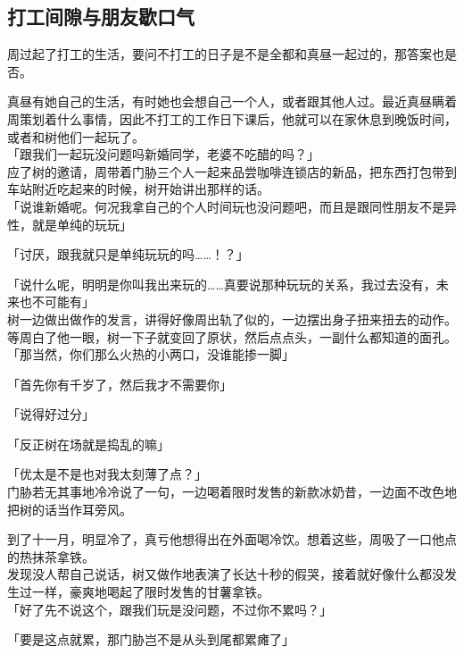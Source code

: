 \subsection{打工间隙与朋友歇口气}

周过起了打工的生活，要问不打工的日子是不是全都和真昼一起过的，那答案也是否。

真昼有她自己的生活，有时她也会想自己一个人，或者跟其他人过。最近真昼瞒着周策划着什么事情，因此不打工的工作日下课后，他就可以在家休息到晚饭时间，或者和树他们一起玩了。\\

「跟我们一起玩没问题吗新婚同学，老婆不吃醋的吗？」\\

应了树的邀请，周带着门胁三个人一起来品尝咖啡连锁店的新品，把东西打包带到车站附近吃起来的时候，树开始讲出那样的话。\\

「说谁新婚呢。何况我拿自己的个人时间玩也没问题吧，而且是跟同性朋友不是异性，就是单纯的玩玩」

「讨厌，跟我就只是单纯玩玩的吗……！？」

「说什么呢，明明是你叫我出来玩的……真要说那种玩玩的关系，我过去没有，未来也不可能有」\\

树一边做出做作的发言，讲得好像周出轨了似的，一边摆出身子扭来扭去的动作。等周白了他一眼，树一下子就变回了原状，然后点点头，一副什么都知道的面孔。\\

「那当然，你们那么火热的小两口，没谁能掺一脚」

「首先你有千岁了，然后我才不需要你」

「说得好过分」

「反正树在场就是捣乱的嘛」

「优太是不是也对我太刻薄了点？」\\

门胁若无其事地冷冷说了一句，一边喝着限时发售的新款冰奶昔，一边面不改色地把树的话当作耳旁风。

到了十一月，明显冷了，真亏他想得出在外面喝冷饮。想着这些，周吸了一口他点的热抹茶拿铁。\\

发现没人帮自己说话，树又做作地表演了长达十秒的假哭，接着就好像什么都没发生过一样，豪爽地喝起了限时发售的甘薯拿铁。\\

「好了先不说这个，跟我们玩是没问题，不过你不累吗？」

「要是这点就累，那门胁岂不是从头到尾都累瘫了」

